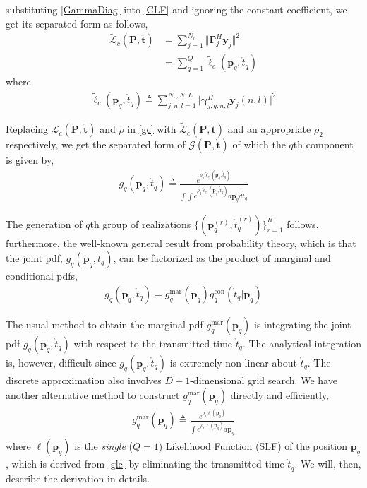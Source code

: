 \documentclass[review]{elsarticle}
\begin{document}
substituting \eqref{GammaDiag} into \eqref{CLF} and ignoring the constant coefficient, we get its separated form as follows,
\begin{align}\label{GLc}
    \tilde{\mathcal{L}}_c(\boldsymbol{P},\mathring{\boldsymbol{t}})&= \sum_{j=1}^{N_r}\Vert \boldsymbol{\Gamma}_{j}^H\boldsymbol{y}_j\Vert ^2\\
    &=\sum_{q=1}^Q \tilde{\ell}_c(\boldsymbol{p}_q,\mathring{t}_q)
\end{align}
where 
\begin{align}\label{glc}
    \tilde{\ell}_c(\boldsymbol{p}_q,\mathring{t}_q)\triangleq \sum_{j,n,l=1}^{N_r,N,L} \vert \boldsymbol{\gamma}_{j,q,n,l}^H\boldsymbol{y}_j(n,l)\vert ^2
\end{align}

Replacing $\mathcal{L}_c(\boldsymbol{P},\mathring{\boldsymbol{t}})$ and $\rho$ in \eqref{gc} with $\tilde{\mathcal{L}}_c(\boldsymbol{P},\mathring{\boldsymbol{t}})$ and an appropriate $\rho_2$ respectively, we get the separated form of $\mathcal{G}(\boldsymbol{P},\mathring{\boldsymbol{t}})$ of which the $q$th component is given by,
\begin{align}\label{gq}
    g_q(\boldsymbol{p}_q,\mathring{t}_q)\triangleq\frac{e^{\rho_2 \tilde{\ell}_c(\boldsymbol{p}_q,\mathring{t}_q)}}{\int\int e^{\rho_2 \tilde{\ell}_c(\boldsymbol{p}_q,\mathring{t}_q)}d\boldsymbol{p}_qd\mathring{t}_q }
\end{align}

The generation of $q$th group of realizations $\lbrace(\boldsymbol{p}_q^{(r)},\mathring{t}_q^{(r)})\rbrace_{r=1}^{R}$ follows, furthermore, the well-known general result from probability theory, which is that the joint pdf, $g_q(\boldsymbol{p}_q,\mathring{t}_q)$, can be factorized as the product of marginal and conditional pdfs,
\begin{align}
    g_q(\boldsymbol{p}_q,\mathring{t}_q)=g_{q}^{\text{mar}}(\boldsymbol{p}_q)g_{q}^{\text{con}}(\mathring{t}_q\vert \boldsymbol{p}_q)
\end{align}

The usual method to obtain the marginal pdf $g_{q}^{\text{mar}}(\boldsymbol{p}_q)$ is integrating the joint pdf $g_q(\boldsymbol{p}_q,\mathring{t}_q)$ with respect to the transmitted time $\mathring{t}_q$. The analytical  integration is, however, difficult since $g_q(\boldsymbol{p}_q,\mathring{t}_q)$ is extremely non-linear about $\mathring{t}_q$. The discrete approximation also involves $D+1$-dimensional grid search. We have another alternative method to construct $ g_{q}^{\text{mar}}(\boldsymbol{p}_q)$ directly and efficiently,
\begin{align}\label{gmar}
    g_{q}^{\text{mar}}(\boldsymbol{p}_q)\triangleq\frac{e^{\rho_1\ell(\boldsymbol{p}_q)}}{\int e^{\rho_1\ell(\boldsymbol{p}_q)} d\boldsymbol{p}_q}
\end{align} 
where $\ell(\boldsymbol{p}_q)$ is the \emph{single} ($Q=1$) Likelihood Function (SLF) of the position $\boldsymbol{p}_q$ , which is derived from \eqref{glc} by eliminating the transmitted time $\mathring{t}_q$. We will, then, describe the derivation in details. 
\end{document}
